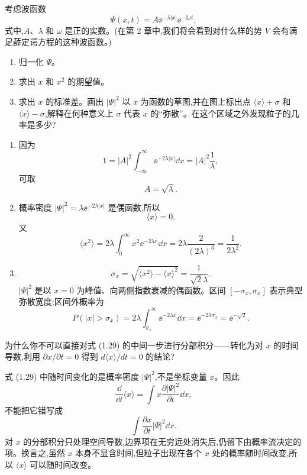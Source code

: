 \begin{question}
考虑波函数
\[
\Psi(x,t)=A \ee^{-\lambda |x|} \ee^{-\ii\omega t},
\]
式中,$A$、$\lambda$ 和 $\omega$ 是正的实数。(在第 2 章中,我们将会看到对什么样的势 $V$ 会有满足薛定谔方程的这种波函数。)
\begin{enumerate}
\item 归一化 $\Psi$。
\item 求出 $x$ 和 $x^2$ 的期望值。
\item 求出 $x$ 的标准差。画出 $|\Psi|^2$ 以 $x$ 为函数的草图,并在图上标出点 $\langle x\rangle+\sigma$ 和 $\langle x\rangle-\sigma$,解释在何种意义上 $\sigma$ 代表 $x$ 的“弥散”。在这个区域之外发现粒子的几率是多少?
\end{enumerate}
\begin{solution}
\begin{enumerate}
\item 因为
\[
1=|A|^2\int_{-\infty}^{\infty}\ee^{-2\lambda |x|}\dd x
=|A|^2\frac{1}{\lambda},
\]
可取
\[
A=\sqrt{\lambda}.
\]
\item 概率密度 $|\Psi|^2=\lambda \ee^{-2\lambda |x|}$ 是偶函数,所以
\[
\langle x\rangle=0.
\]
又
\[
\langle x^2\rangle=2\lambda\int_0^\infty x^2\ee^{-2\lambda x}\dd x
=2\lambda\frac{2}{(2\lambda)^3}=\frac{1}{2\lambda^2}.
\]
\item
\[
\sigma_x=\sqrt{\langle x^2\rangle-\langle x\rangle^2}=\frac{1}{\sqrt2\lambda}.
\]
$|\Psi|^2$ 是以 $x=0$ 为峰值、向两侧指数衰减的偶函数。区间
$[-\sigma_x,\sigma_x]$ 表示典型弥散宽度;区间外概率为
\[
P(|x|>\sigma_x)=2\lambda\int_{\sigma_x}^{\infty}\ee^{-2\lambda x}\dd x
=\ee^{-2\lambda\sigma_x}=\ee^{-\sqrt2}.
\]
\end{enumerate}
\end{solution}
\end{question}

\begin{question}
为什么你不可以直接对式 (1.29) 的中间一步进行分部积分——转化为对 $x$ 的时间导数,利用 $\partial x/\partial t=0$ 得到 $d\langle x\rangle/dt=0$ 的结论?

\par\smallskip
{}

\begin{solution}
式 (1.29) 中随时间变化的是概率密度 $|\Psi|^2$,不是坐标变量 $x$。因此
\[
\frac{\dd}{\dd t}\langle x\rangle
=\int x\frac{\partial |\Psi|^2}{\partial t}\dd x,
\]
不能把它错写成
\[
\int \frac{\partial x}{\partial t}|\Psi|^2\dd x.
\]
对 $x$ 的分部积分只处理空间导数,边界项在无穷远处消失后,仍留下由概率流决定的项。换言之,虽然 $x$ 本身不显含时间,但粒子出现在各个 $x$ 处的概率随时间改变,所以 $\langle x\rangle$ 可以随时间改变。
\end{solution}
\end{question}

